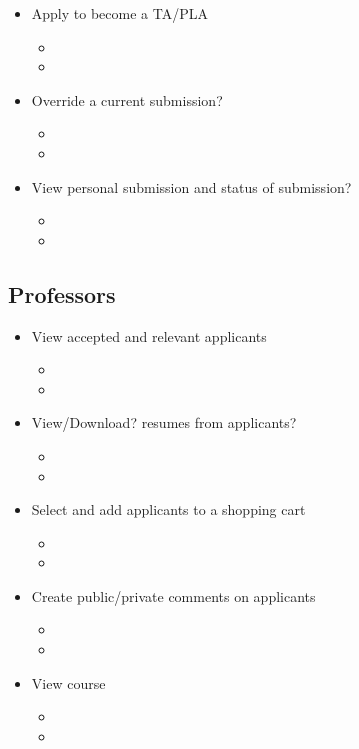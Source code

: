 \documentclass[11pt]{amsart}
\begin{document}
\begin{itemize}
	\item{Apply to become a TA/PLA}
	\begin{itemize}
		\item{}
		\item{}
	\end{itemize}
	\item{Override a current submission?}
	\begin{itemize}
		\item{}
		\item{}
	\end{itemize}
	\item{View personal submission and status of submission?}
	\begin{itemize}
		\item{}
		\item{}
	\end{itemize}
\end{itemize}

\subsection{Professors}

\begin{itemize}
	\item{View accepted and relevant applicants}
	\begin{itemize}
		\item{}
		\item{}
	\end{itemize}
	\item{View/Download? resumes from applicants?}
	\begin{itemize}
		\item{}
		\item{}
	\end{itemize}
	\item{Select and add applicants to a shopping cart}
	\begin{itemize}
		\item{}
		\item{}
	\end{itemize}
	\item{Create public/private comments on applicants}
	\begin{itemize}
		\item{}
		\item{}
	\end{itemize}
	\item{View course}
	\begin{itemize}
		\item{}
		\item{}
	\end{itemize}
\end{itemize}
\end{document}
